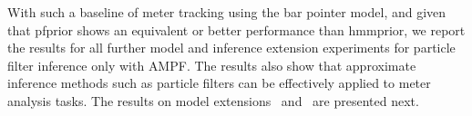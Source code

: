 With such a baseline of meter tracking using the bar pointer model, and given that \acrshort{pfprior} shows an equivalent or better performance than \acrshort{hmmprior}, we report the results for all further model and inference extension experiments for particle filter inference only with \gls{AMPF}. The results also show that approximate inference methods such as particle filters can be effectively applied to meter analysis tasks. The results on model extensions \momodel\ and \spmodel\ are presented next. 
%
%
